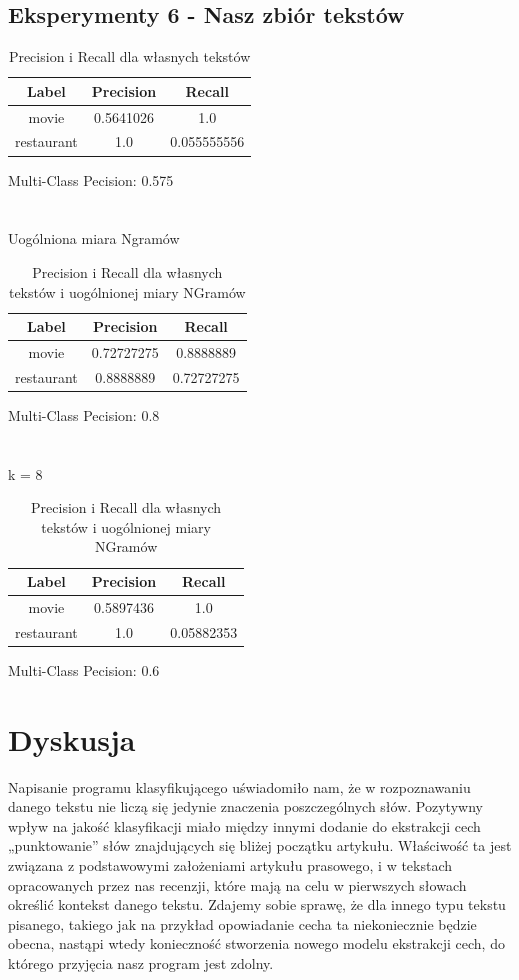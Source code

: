 \documentclass{classrep}
\begin{document}
\subsection{Eksperymenty 6 - Nasz zbiór tekstów}
\begin{table}[H]
\begin{tabular}{|c|c|c|}
\hline
Label      & Precision & Recall      \\ \hline
movie      & 0.5641026 & 1.0         \\ \hline
restaurant & 1.0       & 0.055555556 \\ \hline
\end{tabular}
\caption{Precision i Recall dla własnych tekstów}
\end{table}
Multi-Class Pecision: 0.575\\
\\
\\
Uogólniona miara Ngramów
\begin{table}[H]
\begin{tabular}{|c|c|c|}
\hline
Label      & Precision  & Recall     \\ \hline
movie      & 0.72727275 & 0.8888889  \\ \hline
restaurant & 0.8888889  & 0.72727275 \\ \hline
\end{tabular}
\caption{Precision i Recall dla własnych tekstów i uogólnionej miary NGramów}
\end{table}
Multi-Class Pecision: 0.8\\
\\
\\
k = 8
\begin{table}[H]
\begin{tabular}{|c|c|c|}
\hline
Label      & Precision & Recall     \\ \hline
movie      & 0.5897436 & 1.0        \\ \hline
restaurant & 1.0       & 0.05882353 \\ \hline
\end{tabular}
\caption{Precision i Recall dla własnych tekstów i uogólnionej miary NGramów}
\end{table}
Multi-Class Pecision: 0.6

\section{Dyskusja}
	Napisanie programu klasyfikującego uświadomiło nam, że w rozpoznawaniu danego tekstu nie liczą się jedynie znaczenia poszczególnych słów. Pozytywny wpływ na jakość klasyfikacji miało między innymi dodanie do ekstrakcji cech „punktowanie” słów znajdujących się bliżej początku artykułu. Właściwość ta jest związana z podstawowymi założeniami artykułu prasowego, i w tekstach opracowanych przez nas recenzji, które mają na celu w pierwszych słowach określić kontekst danego tekstu. Zdajemy sobie sprawę, że dla innego typu tekstu pisanego, takiego jak na przykład opowiadanie cecha ta niekoniecznie będzie obecna, nastąpi wtedy konieczność stworzenia nowego modelu ekstrakcji cech, do którego przyjęcia nasz program jest zdolny.
	
\end{document}
